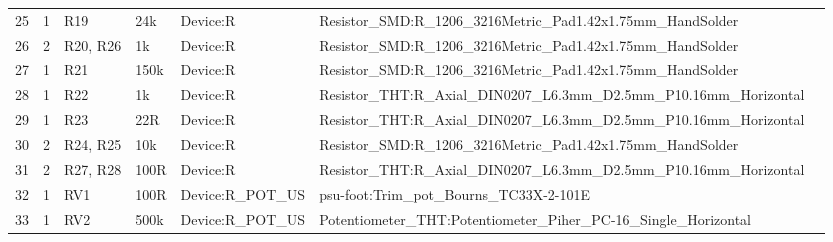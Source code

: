 \documentclass[letterpaper,twocolumn,11pt]{article}
\begin{document}
\begin{sidewaystable*}[ht]
{\begin{tabular}{cclllll}
      25                     & 1                                                        & R19                    & 24k                    & Device:R                         & Resistor\_SMD:R\_1206\_3216Metric\_Pad1.42x1.75mm\_HandSolder                                           \\
      26                     & 2                                                        & R20, R26               & 1k                     & Device:R                         & Resistor\_SMD:R\_1206\_3216Metric\_Pad1.42x1.75mm\_HandSolder                                           \\
      27                     & 1                                                        & R21                    & 150k                   & Device:R                         & Resistor\_SMD:R\_1206\_3216Metric\_Pad1.42x1.75mm\_HandSolder                                           \\
      28                     & 1                                                        & R22                    & 1k                     & Device:R                         & Resistor\_THT:R\_Axial\_DIN0207\_L6.3mm\_D2.5mm\_P10.16mm\_Horizontal                                   \\
      29                     & 1                                                        & R23                    & 22R                    & Device:R                         & Resistor\_THT:R\_Axial\_DIN0207\_L6.3mm\_D2.5mm\_P10.16mm\_Horizontal                                   \\
      30                     & 2                                                        & R24, R25               & 10k                    & Device:R                         & Resistor\_SMD:R\_1206\_3216Metric\_Pad1.42x1.75mm\_HandSolder                                           \\
      31                     & 2                                                        & R27, R28               & 100R                   & Device:R                         & Resistor\_THT:R\_Axial\_DIN0207\_L6.3mm\_D2.5mm\_P10.16mm\_Horizontal                                   \\
      32                     & 1                                                        & RV1                    & 100R                   & Device:R\_POT\_US                & psu-foot:Trim\_pot\_Bourns\_TC33X-2-101E                                                                \\
      33                     & 1                                                        & RV2                    & 500k                   & Device:R\_POT\_US                & Potentiometer\_THT:Potentiometer\_Piher\_PC-16\_Single\_Horizontal                                      \\

\end{tabular}}
\end{sidewaystable*}
\end{document}

